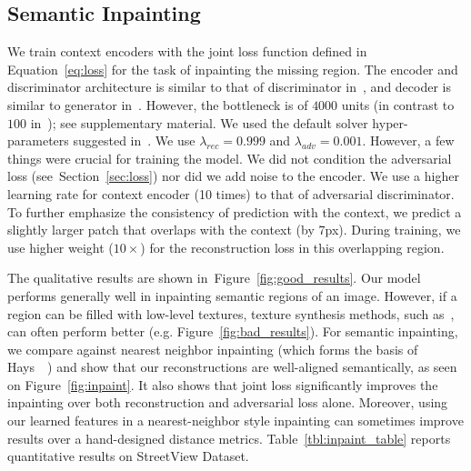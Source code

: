 \documentclass[10pt,twocolumn,letterpaper]{article}
\newcommand{\reffig}[1]{Figure~\ref{fig:#1}}
\newcommand{\refsec}[1]{Section~\ref{sec:#1}}
\newcommand{\reftbl}[1]{Table~\ref{tbl:#1}}
\newcommand{\lblsec}[1]{\label{sec:#1}}
\newcommand{\lbltbl}[1]{\label{tbl:#1}}
\begin{document}
\begin{table}[t]
\centering
{}
\vspace{-0.5em}
\caption{\small Semantic Inpainting accuracy for Paris StreetView dataset on \textit{held-out} images. NN inpainting is basis for~\cite{hays2007scene}.}
\lbltbl{inpaint_table}
\vspace{-0.5em}
\end{table}

\subsection{Semantic Inpainting}
\lblsec{inpaint}
We train context encoders with the joint loss function defined in Equation~\eqref{eq:loss} for the task of inpainting the missing region.
The encoder and discriminator architecture is similar to that of discriminator in~\cite{dcgan}, and decoder is similar to generator in~\cite{dcgan}.
However, the bottleneck is of $4000$ units (in contrast to $100$ in~\cite{dcgan}); see supplementary material.
We used the default solver hyper-parameters suggested in~\cite{dcgan}.
We use $\lambda_{rec}=0.999$ and $\lambda_{adv}=0.001$.
However, a few things were crucial for training the model. We did not condition the adversarial loss (see~\refsec{loss}) nor did we add noise to the encoder. We use a higher learning rate for context encoder (10 times) to that of adversarial discriminator.
To further emphasize the consistency of prediction with the context, we predict a slightly larger patch that overlaps with the context (by 7px). During training, we use higher weight ($10\times$) for the reconstruction loss in this overlapping region.

The qualitative results are shown in~\reffig{good_results}.
Our model performs generally well in inpainting semantic regions of an image.
However, if a region can be filled with low-level textures, texture synthesis methods, such as~\cite{efros1999texture,barnes2009patchmatch}, can often perform better (e.g. \reffig{bad_results}).
For semantic inpainting, we compare against nearest neighbor inpainting (which forms the basis of Hays~\etal~\cite{hays2007scene}) and show that our reconstructions are well-aligned semantically, as seen on \reffig{inpaint}.
It also shows that joint loss significantly improves the inpainting over both reconstruction and adversarial loss alone.
Moreover, using our learned features in a nearest-neighbor style inpainting can sometimes improve results over a hand-designed distance metrics.
%
\reftbl{inpaint_table} reports quantitative results on StreetView Dataset.
\end{document}
